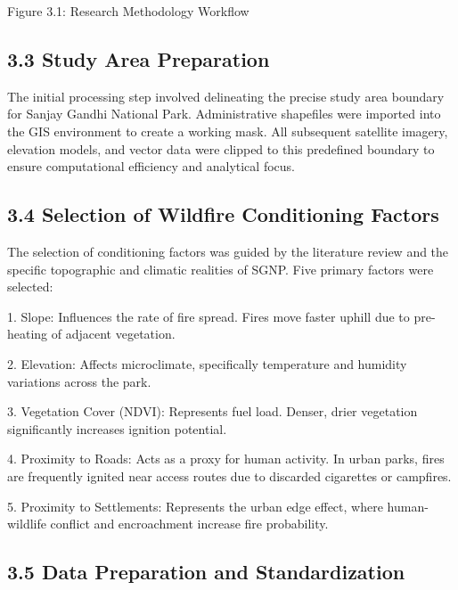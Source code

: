 \documentclass[12pt,a4paper]{article}
\begin{document}
Figure 3.1: Research Methodology Workflow



\subsection*{3.3 Study Area Preparation}

The initial processing step involved delineating the precise study area boundary for Sanjay Gandhi National Park. Administrative shapefiles were imported into the GIS environment to create a working mask. All subsequent satellite imagery, elevation models, and vector data were clipped to this predefined boundary to ensure computational efficiency and analytical focus.



\subsection*{3.4 Selection of Wildfire Conditioning Factors}

The selection of conditioning factors was guided by the literature review and the specific topographic and climatic realities of SGNP. Five primary factors were selected:


1. Slope: Influences the rate of fire spread. Fires move faster uphill due to pre-heating of adjacent vegetation.


2. Elevation: Affects microclimate, specifically temperature and humidity variations across the park.


3. Vegetation Cover (NDVI): Represents fuel load. Denser, drier vegetation significantly increases ignition potential.


4. Proximity to Roads: Acts as a proxy for human activity. In urban parks, fires are frequently ignited near access routes due to discarded cigarettes or campfires.


5. Proximity to Settlements: Represents the urban edge effect, where human-wildlife conflict and encroachment increase fire probability.



\subsection*{3.5 Data Preparation and Standardization}
\end{document}
